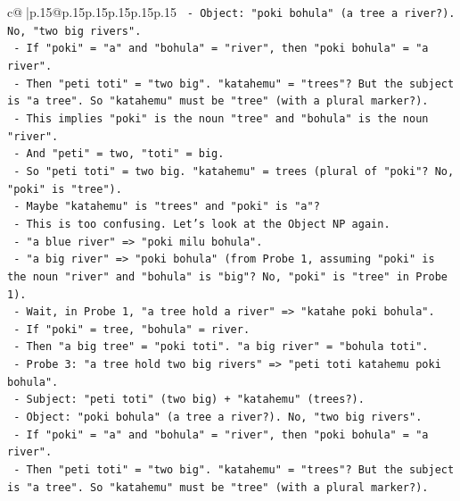 \documentclass{article}
\begin{document}
{\begin{supertabular}{c@{$\;$}|p{.15\linewidth}@{}p{.15\linewidth}p{.15\linewidth}p{.15\linewidth}p{.15\linewidth}p{.15\linewidth}}
{{{\texttt{                {-} Object: "poki bohula" (a tree a river?). No, "two big rivers".} \\
\texttt{                {-} If "poki" = "a" and "bohula" = "river", then "poki bohula" = "a river".} \\
\texttt{                {-} Then "peti toti" = "two big". "katahemu" = "trees"? But the subject is "a tree". So "katahemu" must be "tree" (with a plural marker?).} \\
\texttt{                {-} This implies "poki" is the noun "tree" and "bohula" is the noun "river".} \\
\texttt{                {-} And "peti" = two, "toti" = big.} \\
\texttt{                {-} So "peti toti" = two big. "katahemu" = trees (plural of "poki"? No, "poki" is "tree").} \\
\texttt{                {-} Maybe "katahemu" is "trees" and "poki" is "a"?} \\
\texttt{                {-} This is too confusing. Let's look at the Object NP again.} \\
\texttt{                {-} "a blue river" => "poki milu bohula".} \\
\texttt{                {-} "a big river" => "poki bohula" (from Probe 1, assuming "poki" is the noun "river" and "bohula" is "big"? No, "poki" is "tree" in Probe 1).} \\
\texttt{                {-} Wait, in Probe 1, "a tree hold a river" => "katahe poki bohula".} \\
\texttt{                  {-} If "poki" = tree, "bohula" = river.} \\
\texttt{                  {-} Then "a big tree" = "poki toti". "a big river" = "bohula toti".} \\
\texttt{                  {-} Probe 3: "a tree hold two big rivers" => "peti toti katahemu poki bohula".} \\
\texttt{                    {-} Subject: "peti toti" (two big) + "katahemu" (trees?).} \\
\texttt{                    {-} Object: "poki bohula" (a tree a river?). No, "two big rivers".} \\
\texttt{                    {-} If "poki" = "a" and "bohula" = "river", then "poki bohula" = "a river".} \\
\texttt{                    {-} Then "peti toti" = "two big". "katahemu" = "trees"? But the subject is "a tree". So "katahemu" must be "tree" (with a plural marker?).} \\
}}}
\end{supertabular}}
\end{document}
